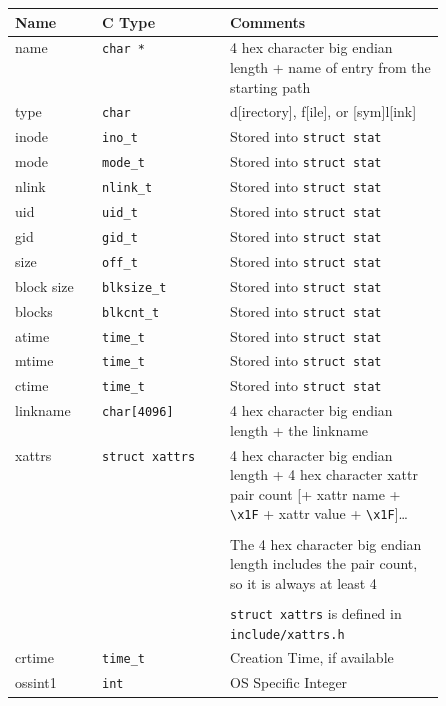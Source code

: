 \begin{longtable}{|l|l|p{0.5\linewidth}|}
  \hline
  Name & C Type & Comments \\
  \hline
  name & \texttt{char *} & 4 hex character big endian length + name of entry from the starting path \\
  \hline
  type & \texttt{char} & d[irectory], f[ile], or [sym]l[ink] \\
  \hline
  inode & \texttt{ino\_t} & Stored into \texttt{struct stat} \\
  \hline
  mode & \texttt{mode\_t} & Stored into \texttt{struct stat} \\
  \hline
  nlink & \texttt{nlink\_t} & Stored into \texttt{struct stat} \\
  \hline
  uid & \texttt{uid\_t} & Stored into \texttt{struct stat} \\
  \hline
  gid & \texttt{gid\_t} & Stored into \texttt{struct stat} \\
  \hline
  size & \texttt{off\_t} & Stored into \texttt{struct stat} \\
  \hline
  block size & \texttt{blksize\_t} & Stored into \texttt{struct stat} \\
  \hline
  blocks & \texttt{blkcnt\_t} & Stored into \texttt{struct stat} \\
  \hline
  atime & \texttt{time\_t} & Stored into \texttt{struct stat} \\
  \hline
  mtime & \texttt{time\_t} & Stored into \texttt{struct stat} \\
  \hline
  ctime & \texttt{time\_t} & Stored into \texttt{struct stat} \\
  \hline
  linkname & \texttt{char[4096]} & 4 hex character big endian length + the linkname \\
  \hline
  xattrs & \texttt{struct xattrs} & 4 hex character big endian length + 4 hex character xattr pair count [+ xattr name + \texttt{\textbackslash x1F} + xattr value + \texttt{\textbackslash x1F}]\ldots \\
  & & \\
  & & The 4 hex character big endian length includes the pair count, so it is always at least 4 \\
  & & \\
  & & \texttt{struct xattrs} is defined in \texttt{include/xattrs.h} \\
  \hline
  crtime & \texttt{time\_t} & Creation Time, if available \\
  \hline
  ossint1 & \texttt{int} & OS Specific Integer \\

\end{longtable}
